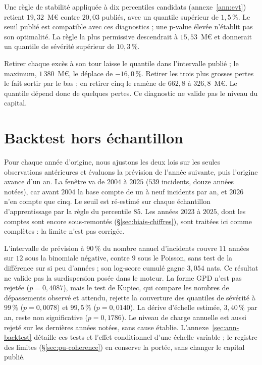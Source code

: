 Une règle de stabilité appliquée à dix percentiles candidats (annexe~\ref{ann:evt}) retient $19{,}32$~M\euro{} contre
$20{,}03$ publiés, avec un quantile supérieur de $1{,}5\,\%$. Le seuil publié est compatible avec ces diagnostics ; une p-value élevée n'établit pas son optimalité.
La règle la plus permissive descendrait à $15{,}53$~M\euro{} et donnerait un quantile de sévérité
supérieur de $10{,}3\,\%$.

Retirer chaque excès à son tour laisse le quantile dans l'intervalle publié ; le maximum,
$1\,380$~M\euro, le déplace de $-16{,}0\,\%$. Retirer les trois plus grosses pertes le fait sortir
par le bas ; en retirer cinq le ramène de $662{,}8$ à $326{,}8$~M\euro. Le quantile dépend donc de
quelques pertes. Ce diagnostic ne valide pas le niveau du capital.

\section{Backtest hors échantillon}
\label{soc:sec:backtest}

Pour chaque année d'origine, nous ajustons les deux lois sur les seules observations antérieures et
évaluons la prévision de l'année suivante, puis l'origine avance d'un an. La fenêtre va de $2004$ à $2025$
($539$ incidents, douze années notées), car avant $2004$ la base compte de un à neuf incidents par
an, et $2026$ n'en compte que cinq. Le seuil est ré-estimé sur chaque échantillon d'apprentissage
par la règle du percentile $85$. Les années $2023$ à $2025$, dont les comptes sont encore sous-remontés
(\S\ref{sec:biais-chiffres}), sont traitées ici comme complètes : la limite n'est pas corrigée.

L'intervalle de prévision à $90\,\%$ du nombre annuel d'incidents couvre $11$ années sur $12$ sous la binomiale négative,
contre $9$ sous le Poisson, sans test de la différence sur si peu d'années ; son log-score cumulé gagne $3{,}054$ nats. Ce résultat ne valide
pas la surdispersion posée dans le moteur. La forme GPD n'est pas rejetée ($p=0{,}4087$), mais le test de Kupiec, qui compare les nombres de dépassements observé et attendu, rejette la couverture des quantiles de sévérité à $99\,\%$ ($p=0{,}0078$) et
$99{,}5\,\%$ ($p=0{,}0140$). La dérive d'échelle estimée, $3{,}40\,\%$ par an, reste non
significative ($p=0{,}1786$). Le niveau de charge annuelle est aussi rejeté sur les dernières
années notées, sans cause établie. L'annexe~\ref{sec:ann-backtest} détaille ces tests et l'effet
conditionnel d'une échelle variable ; le registre des limites (\S\ref{sec:pu-coherence}) en conserve
la portée, sans changer le capital publié.

